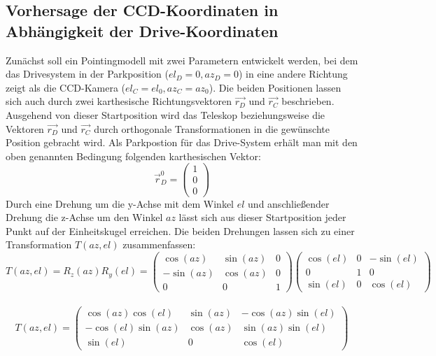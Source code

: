 \subsection{Vorhersage der CCD-Koordinaten in Abhängigkeit der Drive-Koordinaten}
Zunächst soll ein Pointingmodell mit zwei Parametern entwickelt werden, bei dem das Drivesystem in der Parkposition ($el_D=0,az_D=0$) in eine andere Richtung zeigt als die CCD-Kamera ($el_C=el_0,az_C=az_0$). Die beiden Positionen lassen sich auch durch zwei karthesische Richtungsvektoren $\vec{r_D}$ und $\vec{r_C}$ beschrieben. Ausgehend von dieser Startposition wird das Teleskop beziehungsweise die Vektoren $\vec{r_D}$ und $\vec{r_C}$ durch orthogonale Transformationen in die gewünschte Position gebracht wird. Als Parkpostion für das Drive-System erhält man mit den oben genannten Bedingung folgenden karthesischen Vektor:
\begin{equation}
\vec{r}_D^0=\left(\begin{array}{c} 1 \\ 0 \\ 0 \end{array}\right)
\label{eq:startDrive}
\end{equation}
Durch eine Drehung um die y-Achse mit dem Winkel $el$ und anschließender Drehung die z-Achse um den Winkel $az$ lässt sich aus dieser Startposition jeder Punkt auf der Einheitskugel erreichen. Die beiden Drehungen lassen sich zu einer Transformation $T(az,el)$ zusammenfassen:
\begin{equation}
T(az,el)=R_z(az)R_y(el)=
\left(\begin{array}{ccc} \cos(az) & \sin(az) & 0 \\ -\sin(az) & \cos(az) & 0 \\ 0 & 0 & 1\end{array}\right)
\left(\begin{array}{ccc} \cos(el) & 0 &-\sin(el) \\0 & 1 & 0\\ \sin(el) & 0 & \cos(el) \end{array} \right)
\end{equation}\\
\begin{equation}
T(az,el)=\left(\begin{array}{ccc} \cos(az)\cos(el) & \sin(az) &-\cos(az)\sin(el) \\-\cos(el)\sin(az) & \cos(az) & \sin(az)\sin(el)\\ \sin(el) & 0 & \cos(el) \end{array} \right)
\label{eq:TransformMat}
\end{equation}\\
